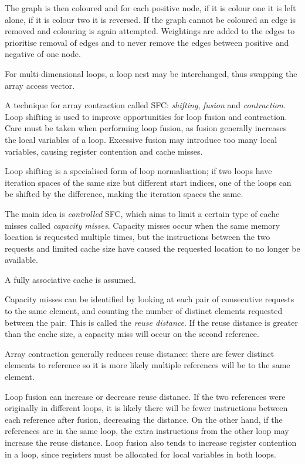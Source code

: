 The graph is then coloured and for each positive node, if it is colour one it is left alone, if it is colour two it is reversed.
If the graph cannot be coloured an edge is removed and colouring is again attempted.
Weightings are added to the edges to prioritise removal of edges and to never remove the edges between positive and negative of one node.

For multi-dimensional loops, a loop nest may be interchanged, thus swapping the array access vector.

A technique for array contraction called SFC: \emph{shifting}, \emph{fusion} and \emph{contraction}.
Loop shifting is used to improve opportunities for loop fusion and contraction. 
Care must be taken when performing loop fusion, as fusion generally increases the local variables of a loop.
Excessive fusion may introduce too many local variables, causing register contention and cache misses.

Loop shifting is a specialised form of loop normalisation; if two loops have iteration spaces of the same size but different start indices,
one of the loops can be shifted by the difference, making the iteration spaces the same.

The main idea is \emph{controlled} SFC, which aims to limit a certain type of cache misses called \emph{capacity misses}.
Capacity misses occur when the same memory location is requested multiple times, but the instructions between the two requests
and limited cache size have caused the requested location to no longer be available.

A fully associative cache is assumed.

Capacity misses can be identified by looking at each pair of consecutive requests to the same element,
and counting the number of distinct elements requested between the pair. This is called the \emph{reuse distance}.
If the reuse distance is greater than the cache size, a capacity miss will occur on the second reference.

Array contraction generally reduces reuse distance: there are fewer distinct elements to reference so it is more likely
multiple references will be to the same element.

Loop fusion can increase or decrease reuse distance. If the two references were originally in different loops,
it is likely there will be fewer instructions between each reference after fusion, decreasing the distance.
On the other hand, if the references are in the same loop, the extra instructions from the other loop
may increase the reuse distance.
Loop fusion also tends to increase register contention in a loop, since registers must be allocated for local variables in both loops.

